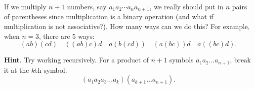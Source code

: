 \documentclass{book}
\begin{document}
\setcounter{cpjt}{175}
\addtocounter{cpjt}{-1}
\begin{activity}\label{act-parenthesize}
\hypertarget{p-998}{}%
If we multiply \(n+1\) numbers, say \(a_1a_2\cdots a_n a_{n+1}\), we really should put in \(n\) pairs of parentheses since multiplication is a binary operation (and what if multiplication is not associative?).  How many ways can we do this?  For example, when \(n = 3\), there are 5 ways:%
\begin{equation*}
(ab)(cd)\quad ((ab)c)d \quad a(b(cd)) \quad (a(bc))d \quad a((bc)d).
\end{equation*}
%
\par\smallskip%
\noindent\textbf{Hint}.\hypertarget{hint-114}{}\quad%
\hypertarget{p-999}{}%
Try working recursively.   For a product of \(n+1\) symbols \(a_{1}a_{2}\ldots a_{n+1}\), break it at the \(k\)th symbol:%
\begin{equation*}
(a_{1}a_{2}a_{3}\ldots a_{k})(a_{k + 1}\ldots a_{n+1}).
\end{equation*}
%
\end{activity}

\clearpage
\end{document}

